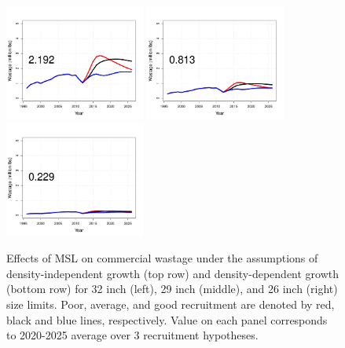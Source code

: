 \begin{figure}[htbp]
		\includegraphics[height=1.5in]{../FIGURES/SIZELIMIT/fig_32_DD_WBio.pdf}
		\includegraphics[height=1.5in]{../FIGURES/SIZELIMIT/fig_29_DD_WBio.pdf}
		\includegraphics[height=1.5in]{../FIGURES/SIZELIMIT/fig_26_DD_WBio.pdf}
	\caption{Effects of MSL on commercial wastage under the assumptions of density-independent growth (top row) and density-dependent growth (bottom row) for 32 inch (left), 29 inch (middle), and 26 inch (right) size limits.  Poor, average, and good recruitment are denoted by red, black and blue lines, respectively.  Value on each panel corresponds to 2020-2025 average over 3 recruitment hypotheses.}
	\label{fig:FIGURES_SIZELIMIT_fig_32_DI_WBio}
\end{figure}


